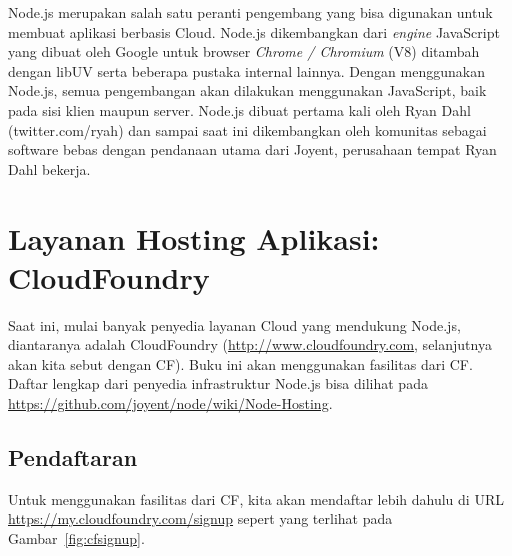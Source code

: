 Node.js merupakan salah satu peranti pengembang yang bisa digunakan untuk membuat aplikasi berbasis Cloud. Node.js dikembangkan dari \textit{engine} JavaScript yang dibuat oleh Google untuk browser \textit{Chrome / Chromium} (V8) ditambah dengan libUV serta beberapa pustaka internal lainnya. Dengan menggunakan Node.js, semua pengembangan akan dilakukan menggunakan JavaScript, baik pada sisi klien maupun server. Node.js dibuat pertama kali oleh Ryan Dahl (twitter.com/ryah) dan sampai saat ini dikembangkan oleh komunitas sebagai software bebas dengan pendanaan utama dari Joyent, perusahaan tempat Ryan Dahl bekerja.

\section{Layanan Hosting Aplikasi: CloudFoundry}

Saat ini, mulai banyak penyedia layanan Cloud yang mendukung Node.js, diantaranya adalah CloudFoundry (\url{http://www.cloudfoundry.com}, selanjutnya akan kita sebut dengan CF). Buku ini akan menggunakan fasilitas dari CF. Daftar lengkap dari penyedia infrastruktur Node.js bisa dilihat pada \url{https://github.com/joyent/node/wiki/Node-Hosting}.

\subsection{Pendaftaran}

Untuk menggunakan fasilitas dari CF, kita akan mendaftar lebih dahulu di URL \url{https://my.cloudfoundry.com/signup} sepert yang terlihat pada Gambar~\ref{fig:cfsignup}.

